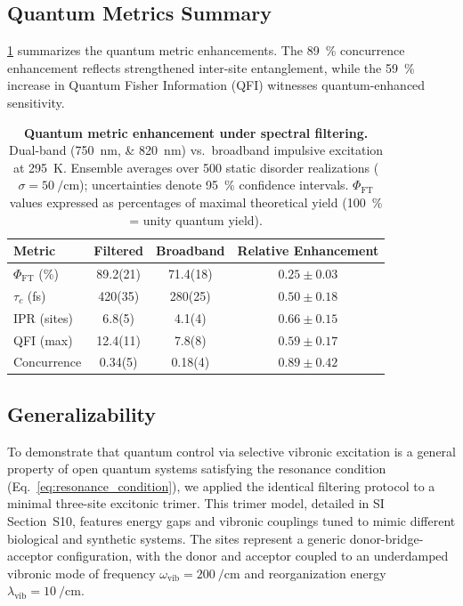\documentclass[journal=jpcl,manuscript=letter]{achemso}
\begin{document}
\subsection*{Quantum Metrics Summary}

\cref{tab:quantum_metrics} summarizes the quantum metric enhancements. The \SI{89}{\percent} concurrence enhancement reflects strengthened inter-site entanglement, while the \SI{59}{\percent} increase in Quantum Fisher Information (QFI) witnesses quantum-enhanced sensitivity.

\begin{table}[t]
\centering
\caption{\textbf{Quantum metric enhancement under spectral filtering.} Dual-band (\SIlist{750;820}{\nano\meter}) vs.\ broadband impulsive excitation at \SI{295}{\kelvin}. Ensemble averages over \num{500} static disorder realizations ($\sigma = \SI{50}{\per\centi\meter}$); uncertainties denote \SI{95}{\percent} confidence intervals. $\Phi_{\mathrm{FT}}$ values expressed as percentages of maximal theoretical yield (\SI{100}{\percent} = unity quantum yield).}
\label{tab:quantum_metrics}
\begin{tabular}{lccc}
\toprule
\textbf{Metric} & \textbf{Filtered} & \textbf{Broadband} & \textbf{Relative Enhancement} \\
\midrule
$\Phi_{\mathrm{FT}}$ (\si{\percent}) & 89.2(21) & 71.4(18) & $0.25 \pm 0.03$ \\
$\tau_c$ (\si{\femto\second}) & 420(35) & 280(25) & $0.50 \pm 0.18$ \\
IPR (sites) & 6.8(5) & 4.1(4) & $0.66 \pm 0.15$ \\
QFI (max) & 12.4(11) & 7.8(8) & $0.59 \pm 0.17$ \\
Concurrence & 0.34(5) & 0.18(4) & $0.89 \pm 0.42$ \\
\bottomrule
\end{tabular}
\end{table}

\subsection*{Generalizability}

To demonstrate that quantum control via selective vibronic excitation is a general property of open quantum systems satisfying the resonance condition (Eq.~\cref{eq:resonance_condition}), we applied the identical filtering protocol to a minimal three-site excitonic trimer. This trimer model, detailed in SI Section~S10, features energy gaps and vibronic couplings tuned to mimic different biological and synthetic systems. The sites represent a generic donor-bridge-acceptor configuration, with the donor and acceptor coupled to an underdamped vibronic mode of frequency $\omega_{\mathrm{vib}} = \SI{200}{\per\centi\meter}$ and reorganization energy $\lambda_{\mathrm{vib}} = \SI{10}{\per\centi\meter}$.
\end{document}

